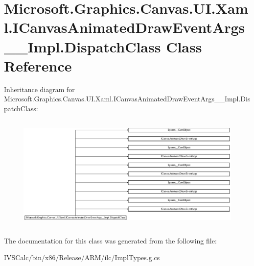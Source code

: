 \hypertarget{class_microsoft_1_1_graphics_1_1_canvas_1_1_u_i_1_1_xaml_1_1_i_canvas_animated_draw_event_args_____impl_1_1_dispatch_class}{}\section{Microsoft.\+Graphics.\+Canvas.\+U\+I.\+Xaml.\+I\+Canvas\+Animated\+Draw\+Event\+Args\+\_\+\+\_\+\+Impl.\+Dispatch\+Class Class Reference}
\label{class_microsoft_1_1_graphics_1_1_canvas_1_1_u_i_1_1_xaml_1_1_i_canvas_animated_draw_event_args_____impl_1_1_dispatch_class}
Inheritance diagram for Microsoft.\+Graphics.\+Canvas.\+U\+I.\+Xaml.\+I\+Canvas\+Animated\+Draw\+Event\+Args\+\_\+\+\_\+\+Impl.\+Dispatch\+Class\+:\begin{figure}[H]
\begin{center}
\leavevmode
\includegraphics[height=5.778612cm]{class_microsoft_1_1_graphics_1_1_canvas_1_1_u_i_1_1_xaml_1_1_i_canvas_animated_draw_event_args_____impl_1_1_dispatch_class}
\end{center}
\end{figure}


The documentation for this class was generated from the following file\+:\begin{DoxyCompactItemize}
\item 
I\+V\+S\+Calc/bin/x86/\+Release/\+A\+R\+M/ilc/Impl\+Types.\+g.\+cs\end{DoxyCompactItemize}

